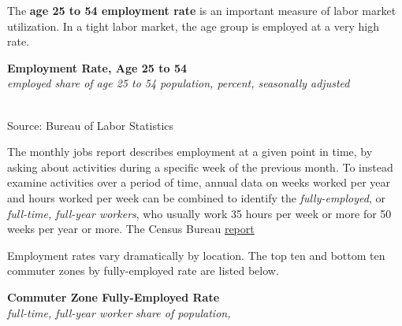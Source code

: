\documentclass{report}
\makeatletter
\newcommand{\tbllink}[1]{\href{https://raw.githubusercontent.com/bdecon/US-chartbook/master/chartbook/data/#1}{\faTable}}
\newcommand*\short[1]{\expandafter\@gobbletwo\number\numexpr#1\relax}
\newcommand{\dateaxisticks}{
		date coordinates in=x, axis line style={draw=none},
		xmax={2024-01-31},
		max space between ticks=40,	    
		xtick={{1990-01-01}, {1992-01-01}, {1994-01-01}, 
			{1996-01-01}, {1998-01-01}, {2000-01-01}, 
			{2002-01-01}, {2004-01-01}, {2006-01-01},
			{2008-01-01}, {2010-01-01}, {2012-01-01}, {2014-01-01},
		    {2016-01-01}, {2018-01-01}, {2020-01-01}, {2022-01-01}, 
		    {2024-01-01}, {2026-01-01}},
		minor xtick={{1989-01-01}, {1991-01-01}, {1993-01-01},
			{1995-01-01}, {1997-01-01}, {1999-01-01}, 
			{2001-01-01}, {2003-01-01}, {2005-01-01}, {2007-01-01},
		    {2009-01-01}, {2011-01-01}, {2013-01-01}, {2015-01-01},
		    {2017-01-01}, {2019-01-01}, {2021-01-01}, {2023-01-01}, 
		    {2025-01-01}, {2027-01-01}},
		enlarge y limits={0.06}, enlarge x limits={0.01},
		xticklabel style={align=center, yshift=-2pt}, tick label style={inner sep=0pt},
		}
\newcommand{\stdline}[4]{\addplot[very thick, no markers, color=#1] 
		table [x=#2, y=#3, col sep=comma] {#4};	}
\newcommand{\rbars}{
		\fill[color=black!10] (axis cs:{1990-07-01},\pgfkeysvalueof{/pgfplots/ymin})
			rectangle (axis cs:{1991-03-01}, \pgfkeysvalueof{/pgfplots/ymax});
		\fill[color=black!10] (axis cs:{2007-12-01},\pgfkeysvalueof{/pgfplots/ymin})
			rectangle (axis cs:{2009-07-01}, \pgfkeysvalueof{/pgfplots/ymax});
		\fill[color=black!10] (axis cs:{2001-03-01},\pgfkeysvalueof{/pgfplots/ymin})
			rectangle (axis cs:{2001-11-01}, \pgfkeysvalueof{/pgfplots/ymax});
		\fill[color=black!10] (axis cs:{2020-02-01},\pgfkeysvalueof{/pgfplots/ymin})
			rectangle (axis cs:{2020-05-01}, \pgfkeysvalueof{/pgfplots/ymax});}
\makeatother
\begin{document}
{\begin{minipage}{1.0\textwidth}
The \textbf{age 25 to 54 employment rate} is an important measure of labor market utilization. In a tight labor market, the age group is employed at a very high rate.  
\vspace{1mm}

\normalsize \textbf{Employment Rate, Age 25 to 54}\\
\footnotesize{\textit{employed share of age 25 to 54 population, percent, seasonally adjusted}}\\
\hspace*{-1mm} \\
\footnotesize{Source: Bureau of Labor Statistics} \hfill \tbllink{epop.csv}
\end{minipage}
\newpage
\begin{minipage}{1.0\textwidth} 
\small The monthly jobs report describes employment at a given point in time, by asking about activities during a specific week of the previous month. To instead examine activities over a period of time, annual data on weeks worked per year and hours worked per week can be combined to identify the \textit{fully-employed}, or \textit{full-time, full-year workers}, who usually work 35 hours per week or more for 50 weeks per year or more. The Census Bureau \href{https://www.census.gov/data/tables/time-series/demo/income-poverty/cps-pinc/pinc-01.html#par_textimage_14}{report} 

Employment rates vary dramatically by location. The top ten and bottom ten commuter zones by fully-employed rate are listed below.
\end{minipage}
\vspace{1mm}

\begin{minipage}{0.55\textwidth}
\normalsize \textbf{Commuter Zone Fully-Employed Rate}\\
\footnotesize{\textit{full-time, full-year worker share of population, }}\\
\vspace*{-6mm}


\end{minipage}}
\end{document}

